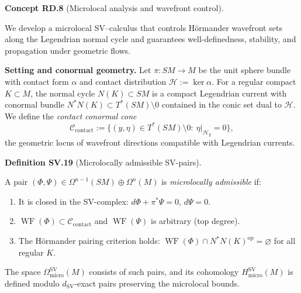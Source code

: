 \documentclass[10pt, letterpaper]{article}
\DeclareMathOperator{\WF}{WF}
\newcommand{\CustomHeading}[3]{%
  \par\medskip\noindent%
  \textbf{#1 #2} \textnormal{(#3)}.\enskip%
}
\newenvironment{DEF}[2]{\begin{unitbox}\CustomHeading{Definition}{#1}{#2}}{\end{unitbox}}
\newenvironment{CONC}[2]{\begin{unitbox}\CustomHeading{Concept}{#1}{#2}}{\end{unitbox}}
\begin{document}
\begin{CONC}{RD.8}{Microlocal analysis and wavefront control}
We develop a microlocal SV–calculus that controls Hörmander wavefront sets along the Legendrian normal cycle and guarantees well-definedness, stability, and propagation under geometric flows.

\medskip\noindent\textbf{Setting and conormal geometry.}
Let $\pi:SM\to M$ be the unit sphere bundle with contact form $\alpha$ and contact distribution $\mathcal H:=\ker\alpha$.
For a regular compact $K\subset M$, the normal cycle $N(K)\subset SM$ is a compact Legendrian current with conormal bundle
$N^*N(K)\subset T^*(SM)\!\setminus\!0$ contained in the conic set dual to $\mathcal H$.  
We define the \emph{contact conormal cone}
\[
\mathcal C_{\mathrm{contact}}
:=\{(y,\eta)\in T^*(SM)\!\setminus\!0:\ \eta|_{\mathcal H_y}=0\},
\]
the geometric locus of wavefront directions compatible with Legendrian currents.

\begin{DEF}{SV.19}{Microlocally admissible SV-pairs}
A pair $(\Phi,\Psi)\in \Omega^{n-1}(SM)\oplus\Omega^n(M)$ is \emph{microlocally admissible} if:
\begin{enumerate}[label=(\alph*)]
\item It is closed in the SV-complex: $d\Phi+\pi^*\Psi=0$, $d\Psi=0$.
\item $\WF(\Phi)\subset \mathcal C_{\mathrm{contact}}$ and $\WF(\Psi)$ is arbitrary (top degree).
\item The Hörmander pairing criterion holds: $\WF(\Phi)\cap N^*N(K)^{\mathrm{op}}=\varnothing$
for all regular $K$.
\end{enumerate}
The space $\Omega^{\operatorname{SV}}_{\mathrm{micro}}(M)$ consists of such pairs,
and its cohomology $H^{\operatorname{SV}}_{\mathrm{micro}}(M)$
is defined modulo $d_{\operatorname{SV}}$-exact pairs preserving the microlocal bounds.
\end{DEF}


\end{CONC}
\end{document}
